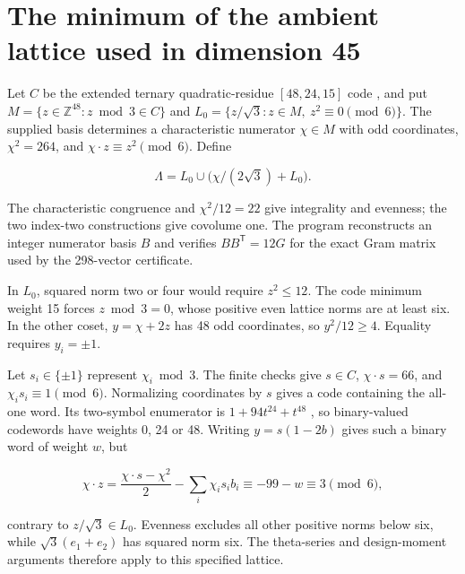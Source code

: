 \section{The minimum of the ambient lattice used in dimension 45}
\label{app:ambient}


Let \(C\) be the extended ternary quadratic-residue \([48,24,15]\) code
\cite{nebe}, and put \(M=\{z\in\mathbb Z^{48}:z\bmod3\in C\}\) and
\(L_0=\{z/\sqrt3:z\in M,\ z^2\equiv0\pmod6\}\). The supplied basis
determines a characteristic numerator \(\chi\in M\) with odd
coordinates, \(\chi^2=264\), and \(\chi\cdot z\equiv z^2\pmod6\). Define

\[
\Lambda=L_0\cup\bigl(\chi/(2\sqrt3)+L_0\bigr).
\]

The characteristic congruence and \(\chi^2/12=22\) give integrality and
evenness; the two index-two constructions give covolume one. The program
reconstructs an integer numerator basis \(B\) and verifies
\(BB^{\mathsf T}=12G\) for the exact Gram matrix used by the 298-vector
certificate.

In \(L_0\), squared norm two or four would require \(z^2\le12\). The
code minimum weight 15 forces \(z\bmod3=0\), whose positive even lattice
norms are at least six. In the other coset, \(y=\chi+2z\) has 48 odd
coordinates, so \(y^2/12\ge4\). Equality requires \(y_i=\pm1\).

Let \(s_i\in\{\pm1\}\) represent \(\chi_i\bmod3\). The finite checks
give \(s\in C\), \(\chi\cdot s=66\), and \(\chi_i s_i\equiv1\pmod6\).
Normalizing coordinates by \(s\) gives a code containing the all-one
word. Its two-symbol enumerator is \(1+94t^{24}+t^{48}\)
\cite[equation (20)]{munemasa-tamura}, so binary-valued codewords have
weights 0, 24 or 48. Writing \(y=s(1-2b)\) gives such a binary word of
weight \(w\), but

\[
\chi\cdot z
=\frac{\chi\cdot s-\chi^2}{2}-\sum_i\chi_i s_i b_i
\equiv-99-w\equiv3\pmod6,
\]

contrary to \(z/\sqrt3\in L_0\). Evenness excludes all other positive
norms below six, while \(\sqrt3(e_1+e_2)\) has squared norm six. The
theta-series and design-moment arguments therefore apply to this
specified lattice.
